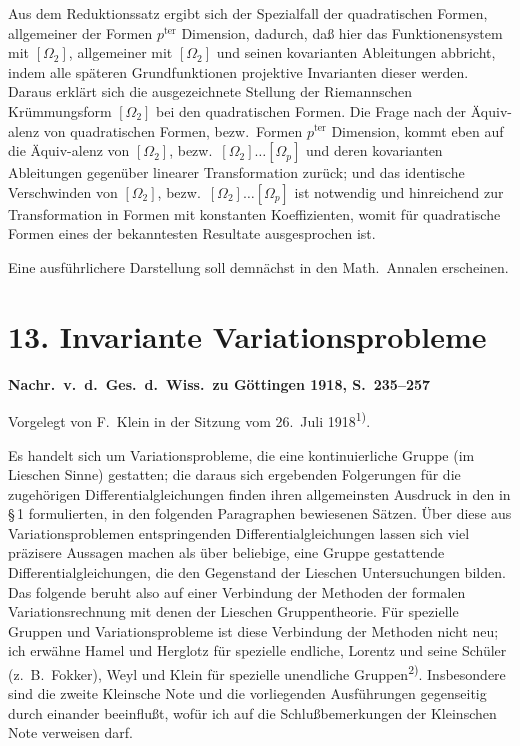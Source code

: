 \documentclass[12pt,a4paper]{article}
\begin{document}
Aus dem Reduktionssatz ergibt sich der Spezialfall der quadratischen Formen, allgemeiner der Formen $p^{\mathrm{ter}}$ Dimension, dadurch, da\ss{} hier das Funktionensystem mit $[\varOmega_{2}]$, allgemeiner mit $[\varOmega_{2}]$ und seinen kovarianten Ableitungen abbricht, indem alle sp\"ateren Grundfunktionen projektive Invarianten dieser werden. Daraus erkl\"art sich die ausgezeichnete Stellung der Riemannschen Kr\"ummungsform $[\varOmega_{2}]$ bei den quadratischen Formen. Die Frage nach der \"Aquiv-alenz von quadratischen Formen, bezw.\ Formen $p^{\mathrm{ter}}$ Dimension, kommt eben auf die \"Aquiv-alenz von $[\varOmega_{2}]$, bezw.\ $[\varOmega_{2}]\ldots[\varOmega_{p}]$ und deren kovarianten Ableitungen gegen\"uber linearer Transformation zur\"uck; und das identische Verschwinden von $[\varOmega_{2}]$, bezw.\ $[\varOmega_{2}]\ldots[\varOmega_{p}]$ ist notwendig und hinreichend zur Transformation in Formen mit konstanten Koeffizienten, womit f\"ur quadratische Formen eines der bekanntesten Resultate ausgesprochen ist.

Eine ausf\"uhrlichere Darstellung soll demn\"achst in den Math.\ Annalen erscheinen.

\newpage

\section*{13. Invariante Variationsprobleme}

\noindent\textbf{Nachr.\ v.\ d.\ Ges.\ d.\ Wiss.\ zu G\"ottingen 1918, S.\ 235--257}

\medskip
\noindent Vorgelegt von F.\ Klein in der Sitzung vom 26.\ Juli 1918\textsuperscript{1)}.

\medskip

Es handelt sich um Variationsprobleme, die eine kontinuierliche Gruppe (im Lieschen Sinne) gestatten; die daraus sich ergebenden Folgerungen f\"ur die zugeh\"origen Differentialgleichungen finden ihren allgemeinsten Ausdruck in den in \S\,1 formulierten, in den folgenden Paragraphen bewiesenen S\"atzen. \"Uber diese aus Variationsproblemen entspringenden Differentialgleichungen lassen sich viel pr\"azisere Aussagen machen als \"uber beliebige, eine Gruppe gestattende Differentialgleichungen, die den Gegenstand der Lieschen Untersuchungen bilden. Das folgende beruht also auf einer Verbindung der Methoden der formalen Variationsrechnung mit denen der Lieschen Gruppentheorie. F\"ur spezielle Gruppen und Variationsprobleme ist diese Verbindung der Methoden nicht neu; ich erw\"ahne Hamel und Herglotz f\"ur spezielle endliche, Lorentz und seine Sch\"uler (z.\ B.\ Fokker), Weyl und Klein f\"ur spezielle unendliche Gruppen\textsuperscript{2)}. Insbesondere sind die zweite Kleinsche Note und die vorliegenden Ausf\"uhrungen gegenseitig durch einander beeinflu\ss{}t, wof\"ur ich auf die Schlu\ss{}bemerkungen der Kleinschen Note verweisen darf.
\end{document}
